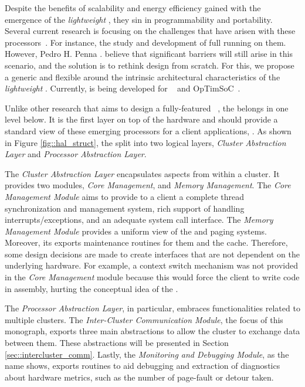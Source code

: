 	Despite the benefits of scalability and energy efficiency gained with the
	emergence of the \textit{lightweight \manycores}, they sin in programmability
	and portability.
	Several current research is focusing on the challenges that have arisen with
	these processors~\cite{}.
	For instance, the study and development of full \oses running on them.
	However, Pedro H. Penna \etal. believe that significant barriers will still
	arise in this scenario, and the solution is to rethink \os design from scratch.
	For this, we propose a generic and flexible \hal around the intrinsic
	architectural characteristics of the \textit{lightweight \manycores}.
	Currently, \hal is being developed for \mppa~\cite{} and OpTimSoC~\cite{}.

	Unlike other research that aims to design a fully-featured \os~\cite{},
	the \hal belongs in one level below.
	It is the first layer on top of the hardware and should provide a standard
	view of these emerging processors for a client applications, \ie \os.
	As shown in Figure \ref{fig::hal_struct}, the \hal split into two logical layers,
	\textit{Cluster Abstraction Layer} and \textit{Processor Abstraction Layer}.

	The \textit{Cluster Abstraction Layer} encapsulates aspects from within a cluster.
	It provides two modules, \textit{Core Management}, and \textit{Memory Management}.
	The \textit{Core Management Module} aims to provide to a client \os a complete
	thread synchronization and management system, rich support of handling
	interrupts/exceptions, and an adequate system call interface.
	The \textit{Memory Management Module} provides a uniform view of the \tlbs
	and paging systems.
	Moreover, its exports maintenance routines for them and the cache.
	Therefore, some design decisions are made to create interfaces that are not
	dependent on the underlying hardware.
	For example, a context switch mechanism was not provided in the
	\textit{Core Management} module because this would force the client \os
	to write code in assembly, hurting the conceptual idea of the \hal.

	The \textit{Processor Abstraction Layer}, in particular, embraces
	functionalities related to multiple clusters.
	The \textit{Inter-Cluster Communication Module}, the focus of
	this monograph, exports three main abstractions to allow the
	cluster to exchange data between them.
	These abstractions will be presented in Section \ref{sec::intercluster_comm}.
	Lastly, the \textit{Monitoring and Debugging Module}, as the
	name shows, exports routines to aid debugging and extraction
	of diagnostics about hardware metrics, such as the number of
	page-fault or detour taken.

